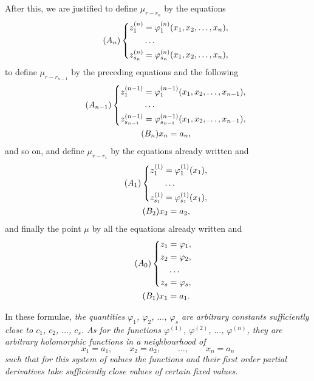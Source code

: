 \documentclass[leqno,11pt]{book}
\makeatletter
\theoremstyle{shape1}
\theoremstyle{shapesmall}
\let\old@phi\phi
\let\old@varphi\varphi
\let\phi\old@varphi
\let\varphi\old@phi
\makeatother
\begin{document}
After this, we are justified to define $\mu_{r-r_{n}}$ by the equations
\begin{equation}
  \label{eq:An}\tag{$A_{n}$}
  \left\{
    \begin{aligned}
      z_{1}^{(n)}&=\phi_{1}^{(n)}(x_{1},x_{2},\dots,x_{n}),\\
      &\dots\\
      z_{s_{n}}^{(n)}&=\phi_{s_{n}}^{(n)}(x_{1},x_{2},\dots,x_{n}),      
    \end{aligned}
  \right.
\end{equation}
to define $\mu_{r-r_{n-1}}$ by the preceding equations and the following
\begin{gather}
  \label{eq:An1}\tag{$A_{n-1}$}
  \left\{
    \begin{aligned}
      z_{1}^{(n-1)}&=\phi_{1}^{(n-1)}(x_{1},x_{2},\dots,x_{n-1}),\\
      &\dots\\
      z_{s_{n-1}}^{(n-1)}&=\phi_{s_{n-1}}^{(n-1)}(x_{1},x_{2},\dots,x_{n-1}),      
    \end{aligned}
  \right.\\
  \label{eq:Bn}\tag{$B_{n}$}
  x_{n}=a_{n},
\end{gather}
and so on, and define $\mu_{r-r_{1}}$ by the equations already written and
\begin{gather}
  \label{eq:A1}\tag{$A_{1}$}
  \left\{
    \begin{aligned}
      z_{1}^{(1)}&=\phi_{1}^{(1)}(x_{1}),\\
      &\dots\\
      z_{s_{1}}^{(1)}&=\phi_{s_{1}}^{(1)}(x_{1}),      
    \end{aligned}
  \right.\\
  \label{eq:B2}\tag{$B_{2}$}
  x_{2}=a_{2},
\end{gather}
and finally the point $\mu$ by all the equations already written and 
\begin{gather}
  \label{eq:A0}\tag{$A_{0}$}
  \left\{
    \begin{aligned}
      z_{1}&=\phi_{1},\\
      z_{2}&=\phi_{2},\\
      &\dots\\
      z_{s}&=\phi_{s},      
    \end{aligned}
  \right.\phantom{\}}\\
  \label{eq:B1}\tag{$B_{1}$}
  x_{1}=a_{1}.
\end{gather}

In these formulae, \emph{the quantities $\phi_{1}$, $\phi_{2}$, $\dots$, $\phi_{s}$ are arbitrary constants sufficiently close to $c_{1}$, $c_{2}$, $\dots$, $c_{s}$. As for the functions $\phi^{(1)}$, $\phi^{(2)}$, $\dots$, $\phi^{(n)}$, they are arbitrary holomorphic functions in a neighbourhood of}
\[
x_{1}=a_{1},\qquad x_{2}=a_{2},\qquad \dots,\qquad x_{n}=a_{n}
\]
\emph{such that for this system of values the functions and their first order partial derivatives take sufficiently close values of certain fixed values.}
\end{document}
